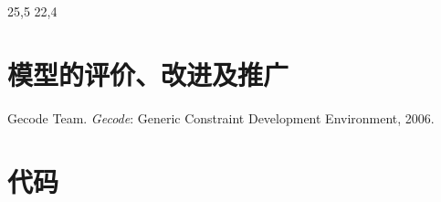 \documentclass[UTF8]{ctexart}
\begin{document}
25,5
22,4
\section{模型的评价、改进及推广}



\begin{thebibliography}{1}  %
 Gecode Team.  \textit{Gecode}: Generic Constraint
  Development Environment, 2006.  


\end{thebibliography}

\appendix
\section{代码}
\end{document}
